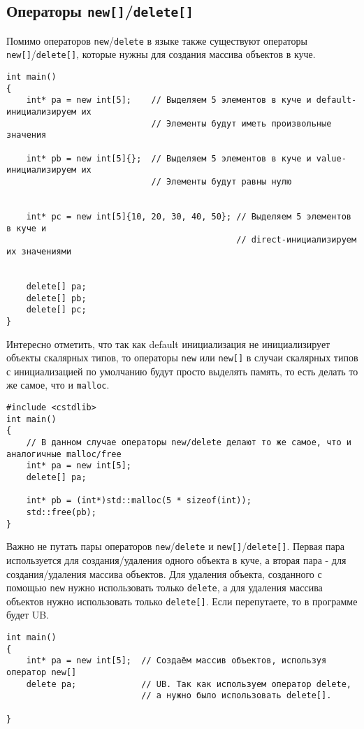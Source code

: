 \documentclass{article}
\begin{document}
\subsection*{Операторы \texttt{new[]}/\texttt{delete[]}}
Помимо операторов \texttt{new}/\texttt{delete} в языке также существуют операторы \texttt{new[]}/\texttt{delete[]}, которые нужны для создания массива объектов в куче.
\begin{lstlisting}
int main()
{
	int* pa = new int[5];    // Выделяем 5 элементов в куче и default-инициализируем их
							 // Элементы будут иметь произвольные значения
							 
	int* pb = new int[5]{};  // Выделяем 5 элементов в куче и value-инициализируем их
							 // Элементы будут равны нулю
	
	
	int* pc = new int[5]{10, 20, 30, 40, 50}; // Выделяем 5 элементов в куче и
	                                          // direct-инициализируем их значениями
	
	
	delete[] pa; 
	delete[] pb; 
	delete[] pc;
}
\end{lstlisting}
Интересно отметить, что так как default инициализация не инициализирует объекты скалярных типов, то операторы \texttt{new} или \texttt{new[]} в случаи скалярных типов с инициализацией по умолчанию будут просто выделять память, то есть делать то же самое, что и \texttt{malloc}.
\begin{lstlisting}
#include <cstdlib>
int main()
{
	// В данном случае операторы new/delete делают то же самое, что и аналогичные malloc/free
	int* pa = new int[5];
	delete[] pa;
	
	int* pb = (int*)std::malloc(5 * sizeof(int));
	std::free(pb);
}
\end{lstlisting}
Важно не путать пары операторов \texttt{new}/\texttt{delete} и \texttt{new[]}/\texttt{delete[]}. Первая пара используется для создания/удаления одного объекта в куче, а вторая пара - для создания/удаления массива объектов. Для удаления объекта, созданного с помощью \texttt{new} нужно использовать только \texttt{delete}, а для удаления массива объектов нужно использовать только \texttt{delete[]}. Если перепутаете, то в программе будет UB.

\begin{lstlisting}
int main()
{
	int* pa = new int[5];  // Создаём массив объектов, используя оператор new[]
	delete pa;             // UB. Так как используем оператор delete, 
	                       // а нужно было использовать delete[].

}
\end{lstlisting}
\end{document}
